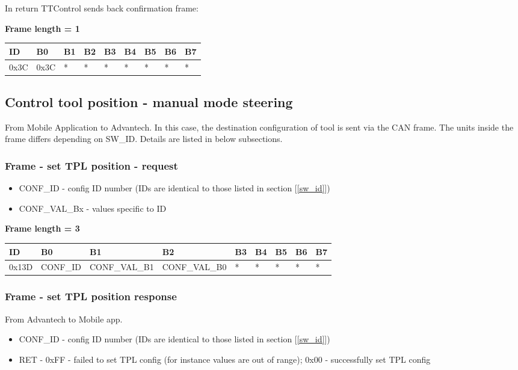 \documentclass{article}
\begin{document}
In return TTControl sends back confirmation frame:

\textbf{Frame length = 1}
\begin{center}
    \begin{tabular}{| p{20pt} | p{40pt} | p{40pt} | p{40pt} | p{40pt} | p{40pt} | p{40pt} | p{40pt} | p{40pt} |}
        \hline
        ID   & B0   & B1 & B2 & B3 & B4 & B5 & B6 & B7 \\
        \hline
        0x3C & 0x3C & *  & *  & *  & *  & *  & *  & *  \\
        \hline
    \end{tabular}
\end{center}

\subsection{Control tool position - manual mode steering}
From Mobile Application to Advantech. In this case, the destination configuration of tool is sent via the CAN frame. The units inside the frame differs depending on SW\_ID. Details are listed in below subsections.
\subsubsection{Frame - set TPL position - request}
\begin{itemize}
    \item CONF\_ID - config ID number (IDs are identical to those listed in section [\ref{sw_id}])
    \item CONF\_VAL\_Bx - values specific to ID
\end{itemize}{}

\textbf{Frame length = 3}
\begin{center}
    \begin{tabular}{| p{30pt} | p{45pt} | p{70pt} | p{70pt} | p{40pt} | p{40pt} | p{40pt} | p{40pt} | p{40pt} |}
        \hline
        ID    & B0       & B1            & B2            & B3 & B4 & B5 & B6 & B7 \\
        \hline
        0x13D & CONF\_ID & CONF\_VAL\_B1 & CONF\_VAL\_B0 & *  & *  & *  & *  & *  \\
        \hline
    \end{tabular}
\end{center}

\subsubsection{Frame - set TPL position response}
From Advantech to Mobile app.
\begin{itemize}
    \item CONF\_ID - config ID number (IDs are identical to those listed in section [\ref{sw_id}])
    \item RET - 0xFF - failed to set TPL config (for instance values are out of range); 0x00 - successfully set TPL config
\end{itemize}{}
\end{document}
